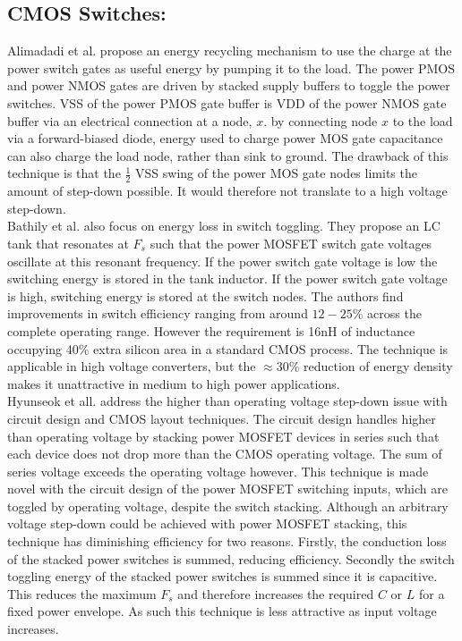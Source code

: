 \documentclass[letterpaper,twocolumn,10pt]{article}
\begin{document}
\subsection{CMOS Switches: }Alimadadi et al.\cite{Alimadadi2008} propose an energy recycling mechanism to use the charge at the power switch gates as useful energy by pumping it to the load. The power PMOS and power NMOS gates are driven by stacked supply buffers to toggle the power switches. VSS of the power PMOS gate buffer is VDD of the power NMOS gate buffer via an electrical connection at a node, $x$. by connecting node $x$ to the load via a forward-biased diode, energy used to charge power MOS gate capacitance can also charge the load node, rather than sink to ground. The drawback of this technique is that the $\frac{1}{2}$ VSS swing of the power MOS gate nodes limits the amount of step-down possible. It would therefore not translate to a high voltage step-down.\\
\indent Bathily et al.\cite{Bathily2012} also focus on energy loss in switch toggling. They propose an LC tank that resonates at $F_s$ such that the power MOSFET switch gate voltages oscillate at this resonant frequency. If the power switch gate voltage is low the switching energy is stored in the tank inductor. If the power switch gate voltage is high, switching energy is stored at the switch nodes. The authors find improvements in switch efficiency ranging from around $12 - 25\%$ across the complete operating range. However the requirement is 16nH of inductance occupying 40\% extra silicon area in a standard CMOS process. The technique is applicable in high voltage converters, but the $\approx$30\% reduction of energy density makes it unattractive in medium to high power applications.\\
\indent Hyunseok et all.\cite{Hyunseok2012} address the higher than operating voltage step-down issue with circuit design and CMOS layout techniques. The circuit design handles higher than operating voltage by stacking power MOSFET devices in series such that each device does not drop more than the CMOS operating voltage. The sum of series voltage exceeds the operating voltage however. This technique is made novel with the circuit design of the power MOSFET switching inputs, which are toggled by operating voltage, despite the switch stacking. Although an arbitrary voltage step-down could be achieved with power MOSFET stacking, this technique has diminishing efficiency for two reasons. Firstly, the conduction loss of the stacked power switches is summed, reducing efficiency. Secondly the switch toggling energy of the stacked power switches is summed since it is capacitive. This reduces the maximum $F_s$ and therefore increases the required $C$ or $L$ for a fixed power envelope. As such this technique is less attractive as input voltage increases.\\
\end{document}
